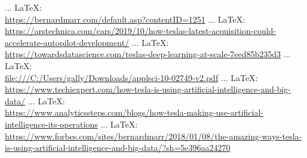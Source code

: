 \begin{thebibliography}{99}
{{{{				 ... \LaTeX:\\ \url{https://bernardmarr.com/default.asp?contentID=1251}
				 ... \LaTeX:\\ \url{https://arstechnica.com/cars/2019/10/how-teslas-latest-acquisition-could-accelerate-autopilot-development/}
				 ... \LaTeX:\\ \url{https://towardsdatascience.com/teslas-deep-learning-at-scale-7eed85b235d3}
				 ... \LaTeX:\\ \url{file:///C:/Users/gally/Downloads/applsci-10-02749-v2.pdf}
				 ... \LaTeX:\\ \url{https://www.techiexpert.com/how-tesla-is-using-artificial-intelligence-and-big-data/}
				 ... \LaTeX:\\ \url{https://www.analyticssteps.com/blogs/how-tesla-making-use-artificial-intelligence-its-operations}
				 ... \LaTeX:\\ \url{https://www.forbes.com/sites/bernardmarr/2018/01/08/the-amazing-ways-tesla-is-using-artificial-intelligence-and-big-data/?sh=5e396aa24270}
				}}}}
\end{thebibliography}

